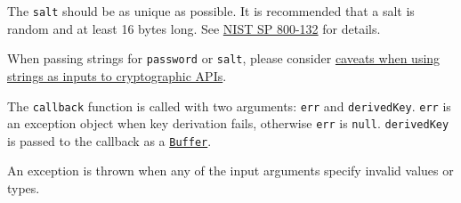 The \texttt{salt} should be as unique as possible. It is recommended
that a salt is random and at least 16 bytes long. See
\href{https://nvlpubs.nist.gov/nistpubs/Legacy/SP/nistspecialpublication800-132.pdf}{NIST
SP 800-132} for details.

When passing strings for \texttt{password} or \texttt{salt}, please
consider
\hyperref[using-strings-as-inputs-to-cryptographic-apis]{caveats when
using strings as inputs to cryptographic APIs}.

The \texttt{callback} function is called with two arguments:
\texttt{err} and \texttt{derivedKey}. \texttt{err} is an exception
object when key derivation fails, otherwise \texttt{err} is
\texttt{null}. \texttt{derivedKey} is passed to the callback as a
\href{buffer.md}{\texttt{Buffer}}.

An exception is thrown when any of the input arguments specify invalid
values or types.

\begin{Shaded}
\begin{Highlighting}[]
\NormalTok{ \{}
\OperatorTok{,}
\NormalTok{\} }\OperatorTok{=}  \NormalTok{(}\NormalTok{)}\OperatorTok{;}

\NormalTok{(}\OperatorTok{,} \OperatorTok{,} \OperatorTok{,}\OperatorTok{,}\KeywordTok{=\textgreater{}}\NormalTok{ \{}
  \OperatorTok{;}
  \NormalTok{(}\NormalTok{))}\OperatorTok{;}  
\NormalTok{\})}\OperatorTok{;}
\NormalTok{(}\OperatorTok{,} \OperatorTok{,} \OperatorTok{,}\NormalTok{ \{ }\OperatorTok{:} \NormalTok{ \}}\OperatorTok{,}\OperatorTok{,}\KeywordTok{=\textgreater{}}\NormalTok{ \{}
  \OperatorTok{;}
  \NormalTok{(}\NormalTok{))}\OperatorTok{;}  
\NormalTok{\})}\OperatorTok{;}
\end{Highlighting}
\end{Shaded}

